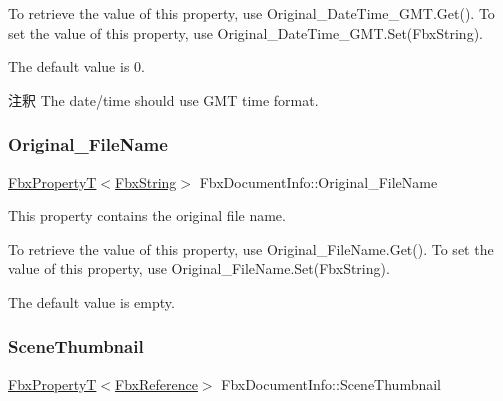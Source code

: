 To retrieve the value of this property, use Original\+\_\+\+Date\+Time\+\_\+\+G\+M\+T.\+Get(). To set the value of this property, use Original\+\_\+\+Date\+Time\+\_\+\+G\+M\+T.\+Set(\+Fbx\+String).

The default value is 0. \begin{DoxyRemark}{注釈}
The date/time should use G\+MT time format. 
\end{DoxyRemark}
\mbox{\label{class_fbx_document_info_aa694d414acff41e98cd5f130c7091873}} 
\subsubsection{\texorpdfstring{Original\+\_\+\+File\+Name}{Original\_FileName}}
{\footnotesize\ttfamily \hyperlink{class_fbx_property_t}{Fbx\+PropertyT}$<$\hyperlink{class_fbx_string}{Fbx\+String}$>$ Fbx\+Document\+Info\+::\+Original\+\_\+\+File\+Name}

This property contains the original file name.

To retrieve the value of this property, use Original\+\_\+\+File\+Name.\+Get(). To set the value of this property, use Original\+\_\+\+File\+Name.\+Set(\+Fbx\+String).

The default value is empty. \mbox{\label{class_fbx_document_info_ab8e6240d40fbc0aa51f72aca4f3b9042}} 
\subsubsection{\texorpdfstring{Scene\+Thumbnail}{SceneThumbnail}}
{\footnotesize\ttfamily \hyperlink{class_fbx_property_t}{Fbx\+PropertyT}$<$\hyperlink{fbxtypes_8h_a44df6a2eec915cf27cd481e5c5e48a24}{Fbx\+Reference}$>$ Fbx\+Document\+Info\+::\+Scene\+Thumbnail\hspace{0.3cm}{\ttfamily [protected]}}

\mbox{\label{class_fbx_document_info_a074e6706550f89bcef9152030a522f11}} 
